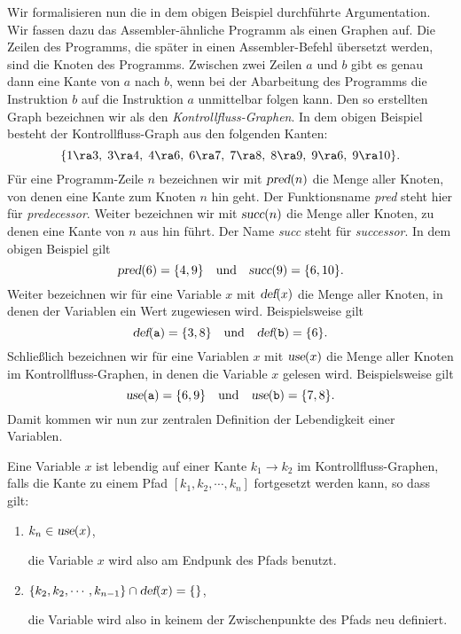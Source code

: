 Wir formalisieren nun die in dem obigen Beispiel durchf\"uhrte Argumentation.  Wir fassen
dazu das Assembler-\"ahnliche Programm als einen Graphen auf.  Die Zeilen des Programms, die
sp\"ater in einen Assembler-Befehl \"ubersetzt werden, sind die Knoten des Programms. 
Zwischen zwei Zeilen $a$ und $b$ gibt es genau dann eine Kante von $a$ nach $b$, wenn bei
der Abarbeitung des Programms die Instruktion $b$ auf die Instruktion $a$ unmittelbar
folgen kann.  Den so erstellten Graph bezeichnen wir als den \emph{Kontrollfluss-Graphen}.
In dem obigen Beispiel besteht der Kontrollfluss-Graph aus den folgenden Kanten:
\[ 
  \{ 1 \ra 3,\; 3 \ra 4,\; 4 \ra 6,\; 6 \ra 7,\; 7 \ra 8,\; 8 \ra 9,\; 9 \ra 6,\; 9 \ra 10 \}.
\]
F\"ur eine Programm-Zeile $n$ bezeichnen wir mit $\textsl{pred}(n)$ die Menge aller Knoten,
von denen eine Kante zum Knoten $n$ hin geht.  Der Funktionsname \textsl{pred} steht hier
f\"ur \emph{predecessor}.   Weiter bezeichnen wir mit $\textsl{succ}(n)$ die Menge aller
Knoten, zu denen eine Kante von $n$ aus hin f\"uhrt.  Der Name \textsl{succ} steht f\"ur
\emph{successor}.  In dem obigen Beispiel gilt
\[ \textsl{pred}(6) = \{ 4, 9 \} \quad \mbox{und} \quad \textsl{succ}(9) = \{ 6, 10 \}.  \]
Weiter bezeichnen wir f\"ur eine Variable $x$ mit $\textsl{def}(x)$ die Menge aller Knoten,
in denen der Variablen ein Wert zugewiesen wird.  Beispielsweise gilt
\[ 
   \textsl{def}(\mathtt{a}) = \{ 3, 8 \} \quad \mbox{und} \quad
   \textsl{def}(\mathtt{b}) = \{ 6 \}.
\]
Schlie{\ss}lich bezeichnen wir f\"ur eine Variablen $x$ mit $\textsl{use}(x)$ die Menge aller
Knoten im Kontrollfluss-Graphen, in denen die Variable $x$ gelesen wird.  Beispielsweise gilt
\[ 
   \textsl{use}(\mathtt{a}) = \{ 6, 9 \} \quad \mbox{und} \quad
   \textsl{use}(\mathtt{b}) = \{ 7, 8 \}.
\]
Damit kommen wir nun zur zentralen Definition der Lebendigkeit einer Variablen.

\begin{Definition}[lebendig]
Eine Variable $x$ ist lebendig auf einer Kante $k_1 \rightarrow k_2$ im Kontrollfluss-Graphen,
falls die Kante zu einem Pfad $[k_1, k_2, \cdots, k_n]$ fortgesetzt werden kann, so dass
gilt:
\begin{enumerate}
\item $k_n \in \textsl{use}(x)$,

      die Variable $x$ wird also am Endpunk des Pfads benutzt.
\item $\{ k_2, k_2, \cdots, k_{n-1} \} \cap \textsl{def}(x) = \{\}$,

      die Variable wird also in keinem der Zwischenpunkte des Pfads neu definiert.
\end{enumerate}
\end{Definition}

